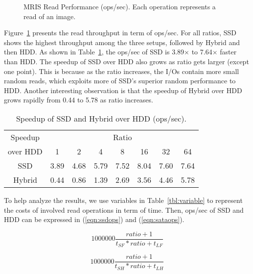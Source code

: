 \begin{figure}[t]
\begin{centering}
\caption{MRIS Read Performance (ops/sec). Each operation represents a
read of an image.}
\label{fig:mrisopssec}
\end{centering}
\end{figure}

Figure~\ref{fig:mrisopssec} presents the read throughput in term of
ops/sec. For all ratios, SSD shows the highest throughput among the
three setups, followed by Hybrid and then HDD. As shown in
Table~\ref{tbl:speedup}, the ops/sec of SSD is 3.89$\times$ to
7.64$\times$ faster than HDD. The speedup of SSD over HDD also grows
as ratio gets larger (except one point). This is because as the ratio
increases, the I/Os contain more small random reads, which exploits
more of SSD's superior random performance to HDD. Another interesting
observation is that the speedup of Hybrid over HDD grows rapidly from
0.44 to 5.78 as ratio increases.

\begin{table}[tc]
{\centering \footnotesize
\begin{tabular}{c|c|c|c|c|c|c|c}
\hline 
  Speedup & \multicolumn{7}{c}{Ratio} \\ \cline{2-8}
  over HDD & 1 & 2 & 4 & 8 & 16 & 32 & 64 \\ \hline
  SSD & 3.89 & 4.68 & 5.79 & 7.52 & 8.04 & 7.60 & 7.64  \\
  Hybrid & 0.44 & 0.86 & 1.39 & 2.69 & 3.56 & 4.46 & 5.78 \\ \hline
\end{tabular}
 \caption{Speedup of SSD and Hybrid over HDD (ops/sec).}
\label{tbl:speedup}
}
\end{table}

To help analyze the results, we use variables in
Table~\ref{tbl:variable} to represent the costs of involved read
operations in term of time. Then, ops/sec of SSD and HDD can be
expressed in (\ref{eqn:ssdops}) and (\ref{eqn:sataops}). 

\begin{equation}
\label{eqn:ssdops}
    1000000 \frac{ratio + 1}{t_{SF} * ratio + t_{LF}}
\end{equation}

\begin{equation}
\label{eqn:sataops}
    1000000 \frac{ratio + 1}{t_{SH} * ratio + t_{LH}}
\end{equation}

